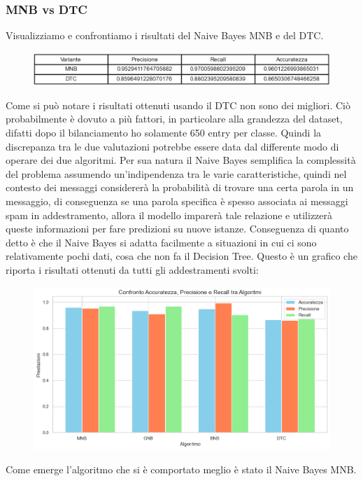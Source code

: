 \documentclass[]{article}
\begin{document}
                    \subsubsection{MNB vs DTC}
                        Visualizziamo e confrontiamo i risultati del Naive Bayes MNB e del DTC.

                        \begin{figure}[H]
                            \centering
                            \includegraphics[width=1\linewidth]{images/FinalTable.png}
                            \label{fig:enter-label}
                        \end{figure}

                        Come si può notare i risultati ottenuti  usando il DTC non sono dei migliori. Ciò probabilmente è dovuto a più fattori, in particolare  alla grandezza del dataset, difatti dopo il bilanciamento ho solamente 650 entry per classe. Quindi la discrepanza tra le due valutazioni potrebbe essere data dal differente modo di operare dei due algoritmi. Per sua natura il Naive Bayes semplifica la complessità del problema assumendo un'indipendenza tra le varie caratteristiche, quindi nel contesto dei messaggi considererà la probabilità di trovare una certa parola in un messaggio, di conseguenza se una parola specifica è spesso associata ai messaggi spam in addestramento, allora il modello imparerà tale relazione e utilizzerà queste informazioni per fare predizioni su nuove istanze. Conseguenza di quanto detto è che il Naive Bayes si adatta facilmente a situazioni in cui ci sono relativamente pochi dati, cosa che non fa il Decision Tree.
                        Questo è un grafico che riporta i risultati ottenuti da tutti gli addestramenti svolti:
                        \begin{figure}[H]
                            \centering
                            \includegraphics[width=1\linewidth]{images/AllResult.png}
                            \label{fig:enter-label}
                        \end{figure}
                        Come emerge l'algoritmo che si è comportato meglio è stato il Naive Bayes MNB.
        \newpage
\end{document}
